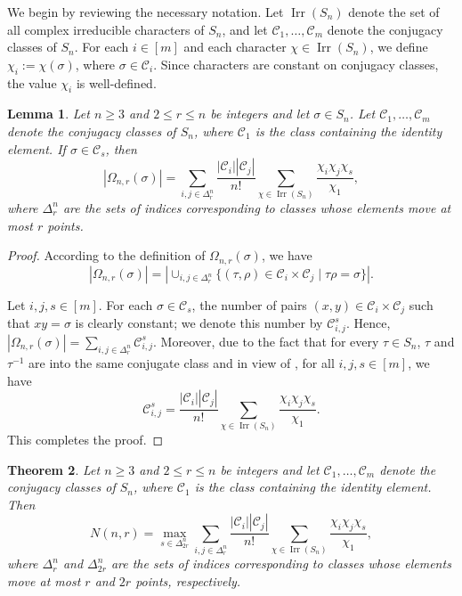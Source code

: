 \documentclass{amsart}
\newtheorem{thm}{Theorem}[section]
\newtheorem{lem}[thm]{Lemma}
\numberwithin{equation}{section}
\begin{document}
We begin by reviewing the necessary notation.  
Let \(\operatorname{Irr}(S_n)\) denote the set of all complex irreducible characters of \(S_n\), and let \(\mathcal{C}_1, \dots, \mathcal{C}_m\) denote the conjugacy classes of \(S_n\). For each  \(i \in [m]\) and each character \(\chi \in \operatorname{Irr}(S_n)\), we define \(\chi_i := \chi(\sigma)\), where \(\sigma \in \mathcal{C}_i\). Since characters are constant on conjugacy classes, the value \(\chi_i\) is well-defined.
\begin{lem}\label{31}
Let  $n\geq 3$ and $2\leq r\leq n$ be integers   and let $\sigma\in S_n$. Let \(\mathcal{C}_1, \dots, \mathcal{C}_m\) denote the conjugacy classes of \(S_n\), where \(\mathcal{C}_1\) is the class containing the identity element. If $\sigma \in    \mathcal{C}_s$, then 
\[
|\Omega_{n, r}(\sigma)| =  \sum_{i,j \in \Delta_r^n } \frac{|\mathcal{C}_i||\mathcal{C}_j|}{n!} \sum_{\chi \in \operatorname{Irr}(S_n)} \frac{\chi_i \chi_j \chi_s}{\chi_1},
\]
where $\Delta^n_{r}$ are the sets of indices corresponding to classes whose elements move at most $r$   points.
\end{lem}
\begin{proof}
According to the definition of \(\Omega_{n, r}(\sigma)\), we have
\[
|\Omega_{n, r}(\sigma)| = \left| \cup_{i,j \in \Delta_r^n} \{(\tau, \rho) \in \mathcal{C}_i \times \mathcal{C}_j \mid \tau \rho = \sigma\} \right|.
\]

Let \(i, j, s \in [m]\). For each \(\sigma \in \mathcal{C}_s\), the number of pairs \((x, y) \in \mathcal{C}_i \times \mathcal{C}_j\) such that \(xy = \sigma\) is clearly constant; we denote this number by \(\mathcal{C}_{i,j}^{s}\). Hence,
$
|\Omega_{n, r}(\sigma)| = \sum_{i,j \in \Delta_r^n} \mathcal{C}_{i,j}^{s}.
$
Moreover, due to the fact that for every $\tau \in S_n$, $\tau$ and $\tau^{-1}$ are into the same conjugate class and in view of \cite[Lemma 2.15 and problem 3.9]{isaacs},  for all \(i, j, s \in [m]\), we have
\[
\mathcal{C}_{i,j}^{s} = \frac{|\mathcal{C}_i||\mathcal{C}_j|}{n!} \sum_{\chi \in \operatorname{Irr}(S_n)} \frac{\chi_i \chi_j \chi_s}{\chi_1}.
\]
This completes the proof.
\end{proof}
\begin{thm}\label{thchar}
Let  $n\geq 3$ and $2\leq r\leq n$ be integers   and let   \(\mathcal{C}_1, \dots, \mathcal{C}_m\) denote the conjugacy classes of \(S_n\), where \(\mathcal{C}_1\) is the class containing the identity element. Then
\begin{equation}\label{formul}
N(n, r) = \max_{s \in \Delta_{2r}^n} \sum_{i,j \in \Delta_r^n } \frac{|\mathcal{C}_i||\mathcal{C}_j|}{n!} \sum_{\chi \in \operatorname{Irr}(S_n)} \frac{\chi_i \chi_j \chi_s}{\chi_1},
\end{equation}
where $\Delta^n_{r}$ and $\Delta^n_{2r}$ are the sets of indices corresponding to classes whose elements move at most $r$ and $2r$  points, respectively.
\end{thm}
\end{document}
